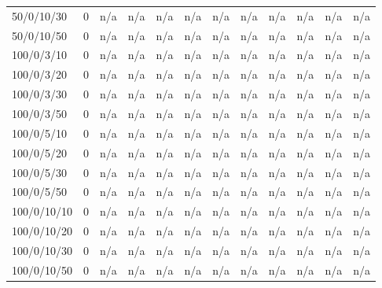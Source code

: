 \begin{table}[htbp]
{\begin{tabular}{lr*{10}{r}}
50/0/10/30 & 0 & n/a & n/a & n/a & n/a & n/a & n/a & n/a & n/a & n/a & n/a \\ 
50/0/10/50 & 0 & n/a & n/a & n/a & n/a & n/a & n/a & n/a & n/a & n/a & n/a \\ 
100/0/3/10 & 0 & n/a & n/a & n/a & n/a & n/a & n/a & n/a & n/a & n/a & n/a \\ 
100/0/3/20 & 0 & n/a & n/a & n/a & n/a & n/a & n/a & n/a & n/a & n/a & n/a \\ 
100/0/3/30 & 0 & n/a & n/a & n/a & n/a & n/a & n/a & n/a & n/a & n/a & n/a \\ 
100/0/3/50 & 0 & n/a & n/a & n/a & n/a & n/a & n/a & n/a & n/a & n/a & n/a \\ 
100/0/5/10 & 0 & n/a & n/a & n/a & n/a & n/a & n/a & n/a & n/a & n/a & n/a \\ 
100/0/5/20 & 0 & n/a & n/a & n/a & n/a & n/a & n/a & n/a & n/a & n/a & n/a \\ 
100/0/5/30 & 0 & n/a & n/a & n/a & n/a & n/a & n/a & n/a & n/a & n/a & n/a \\ 
100/0/5/50 & 0 & n/a & n/a & n/a & n/a & n/a & n/a & n/a & n/a & n/a & n/a \\ 
100/0/10/10 & 0 & n/a & n/a & n/a & n/a & n/a & n/a & n/a & n/a & n/a & n/a \\ 
100/0/10/20 & 0 & n/a & n/a & n/a & n/a & n/a & n/a & n/a & n/a & n/a & n/a \\ 
100/0/10/30 & 0 & n/a & n/a & n/a & n/a & n/a & n/a & n/a & n/a & n/a & n/a \\ 
100/0/10/50 & 0 & n/a & n/a & n/a & n/a & n/a & n/a & n/a & n/a & n/a & n/a \\ 
\bottomrule
\end{tabular}
}
\end{table}

